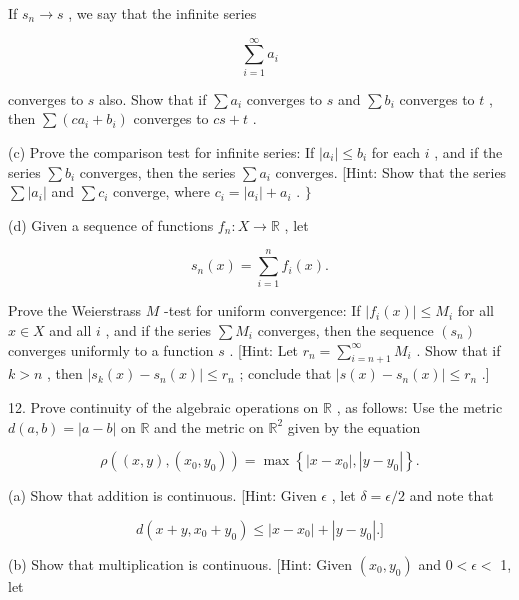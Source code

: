 If \({s}_{n} \rightarrow  s\) , we say that the infinite series

\[
\mathop{\sum }\limits_{{i = 1}}^{\infty }{a}_{i}
\]

converges to \(s\) also. Show that if \(\sum {a}_{i}\) converges to \(s\) and \(\sum {b}_{i}\) converges to \(t\) , then \(\sum \left( {c{a}_{i} + {b}_{i}}\right)\) converges to \({cs} + t\) .

(c) Prove the comparison test for infinite series: If \(\left| {a}_{i}\right|  \leq  {b}_{i}\) for each \(i\) , and if the series \(\sum {b}_{i}\) converges, then the series \(\sum {a}_{i}\) converges. [Hint: Show that the series \(\sum \left| {a}_{i}\right|\) and \(\sum {c}_{i}\) converge, where \({c}_{i} = \left| {a}_{i}\right|  + {a}_{i}\) . \(\}\)

(d) Given a sequence of functions \({f}_{n} : X \rightarrow  \mathbb{R}\) , let

\[
{s}_{n}\left( x\right)  = \mathop{\sum }\limits_{{i = 1}}^{n}{f}_{i}\left( x\right) .
\]

Prove the Weierstrass \(M\) -test for uniform convergence: If \(\left| {{f}_{i}\left( x\right) }\right|  \leq  {M}_{i}\) for all \(x \in  X\) and all \(i\) , and if the series \(\sum {M}_{i}\) converges, then the sequence \(\left( {s}_{n}\right)\) converges uniformly to a function \(s\) . [Hint: Let \({r}_{n} = \mathop{\sum }\limits_{{i = n + 1}}^{\infty }{M}_{i}\) . Show that if \(k > n\) , then \(\left| {{s}_{k}\left( x\right)  - {s}_{n}\left( x\right) }\right|  \leq  {r}_{n}\) ; conclude that \(\left| {s\left( x\right)  - {s}_{n}\left( x\right) }\right|  \leq  {r}_{n}\) .]

12. Prove continuity of the algebraic operations on \(\mathbb{R}\) , as follows: Use the metric \(d\left( {a,b}\right)  = \left| {a - b}\right|\) on \(\mathbb{R}\) and the metric on \({\mathbb{R}}^{2}\) given by the equation

\[
\rho \left( {\left( {x,y}\right) ,\left( {{x}_{0},{y}_{0}}\right) }\right)  = \max \left\{  {\left| {x - {x}_{0}}\right| ,\left| {y - {y}_{0}}\right| }\right\}  .
\]

(a) Show that addition is continuous. [Hint: Given \(\epsilon\) , let \(\delta  = \epsilon /2\) and note that

\[
d\left( {x + y,{x}_{0} + {y}_{0}}\right)  \leq  \left| {x - {x}_{0}}\right|  + \left| {y - {y}_{0}}\right| .\rbrack
\]

(b) Show that multiplication is continuous. [Hint: Given \(\left( {{x}_{0},{y}_{0}}\right)\) and \(0 < \epsilon  <\) 1, let

